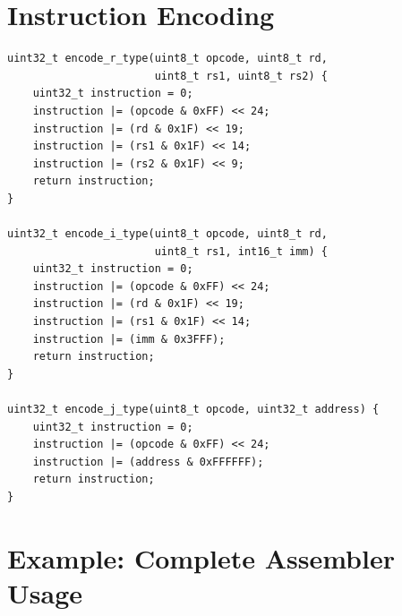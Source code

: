 \documentclass[12pt,a4paper,oneside]{book}
\begin{document}
\section{Instruction Encoding}

\begin{lstlisting}[style=c, caption={Instruction Encoder}]
uint32_t encode_r_type(uint8_t opcode, uint8_t rd, 
                       uint8_t rs1, uint8_t rs2) {
    uint32_t instruction = 0;
    instruction |= (opcode & 0xFF) << 24;
    instruction |= (rd & 0x1F) << 19;
    instruction |= (rs1 & 0x1F) << 14;
    instruction |= (rs2 & 0x1F) << 9;
    return instruction;
}

uint32_t encode_i_type(uint8_t opcode, uint8_t rd, 
                       uint8_t rs1, int16_t imm) {
    uint32_t instruction = 0;
    instruction |= (opcode & 0xFF) << 24;
    instruction |= (rd & 0x1F) << 19;
    instruction |= (rs1 & 0x1F) << 14;
    instruction |= (imm & 0x3FFF);
    return instruction;
}

uint32_t encode_j_type(uint8_t opcode, uint32_t address) {
    uint32_t instruction = 0;
    instruction |= (opcode & 0xFF) << 24;
    instruction |= (address & 0xFFFFFF);
    return instruction;
}
\end{lstlisting}

\section{Example: Complete Assembler Usage}
\end{document}
